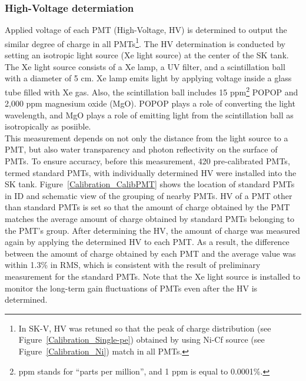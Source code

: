 \subsubsection{High-Voltage determiation}\label{Section_HV}
\vs\hs
Applied voltage of each PMT (High-Voltage, HV) is determined to output the similar degree of charge in all PMTs\footnote{In SK-V, HV was retuned so that the peak of charge distribution (see Figure~\ref{Calibration_Single-pe}) obtained by using Ni-Cf source (see Figure~\ref{Calibration_Ni}) match in all PMTs.}.
The HV determination is conducted by setting an isotropic light source (Xe light source) at the center of the SK tank.
The Xe light source consists of a Xe lamp, a UV filter, and a scintillation ball with a diameter of 5 cm.
Xe lamp emits light by applying voltage inside a glass tube filled with Xe gas.
Also, the scintillation ball includes 15 ppm\footnote{ppm stands for ``parts per million'', and 1 ppm is equal to 0.0001\%.} POPOP and 2,000 ppm magnesium oxide (MgO).
POPOP plays a role of converting the light wavelength, and MgO plays a role of emitting light from the scintillation ball as isotropically as posiible.\\
\hs
This measurement depends on not only the distance from the light source to a PMT, but also water transparency and photon reflectivity on the surface of PMTs.
To ensure accuracy, before this measurement, 420 pre-calibrated PMTs, termed standard PMTs, with individually determined HV were installed into the SK tank.
Figure~\ref{Calibration_CalibPMT} shows the location of standard PMTs in ID and schematic view of the grouping of nearby PMTs.
HV of a PMT other than standard PMTs is set so that the amount of charge obtained by the PMT matches the average amount of charge obtained by standard PMTs belonging to the PMT's group.
After determining the HV, the amount of charge was measured again by applying the determined HV to each PMT.
As a result, the difference between the amount of charge obtained by each PMT and the average value was within 1.3\% in RMS, which is consistent with the result of preliminary measurement for the standard PMTs.
Note that the Xe light source is installed to monitor the long-term gain fluctuations of PMTs even after the HV is determined.

